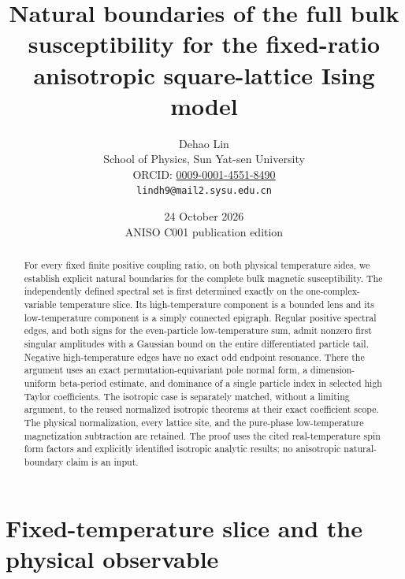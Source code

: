 \documentclass[11pt]{article}
\title{Natural boundaries of the full bulk susceptibility\newline
for the fixed-ratio anisotropic square-lattice Ising model}
\author{Dehao Lin\\{\small School of Physics, Sun Yat-sen University}\\{\small ORCID: \href{https://orcid.org/0009-0001-4551-8490}{0009-0001-4551-8490}}\\{\small\texttt{lindh9@mail2.sysu.edu.cn}}}
\date{24 October 2026\\{\small ANISO C001 publication edition}}
\numberwithin{equation}{section}
\theoremstyle{definition}
\begin{document}
\maketitle
\begin{abstract}
For every fixed finite positive coupling ratio, on both physical
temperature sides, we establish explicit natural boundaries for the
complete bulk magnetic susceptibility. The independently defined
spectral set is first determined exactly on the one-complex-variable
temperature slice. Its high-temperature component is a bounded lens and
its low-temperature component is a simply connected epigraph. Regular
positive spectral edges, and both signs for the even-particle low-temperature
sum, admit nonzero first singular amplitudes with a Gaussian bound on the
entire differentiated particle tail. Negative high-temperature edges have
no exact odd endpoint resonance. There the argument uses an exact
permutation-equivariant pole normal form, a dimension-uniform beta-period
estimate, and dominance of a single particle index in selected high Taylor
coefficients. The isotropic case is separately matched, without a limiting
argument, to the reused normalized isotropic theorems at their exact
coefficient scope. The physical normalization, every lattice site, and the
pure-phase low-temperature magnetization subtraction are retained. The
proof uses the cited real-temperature spin form factors and explicitly
identified isotropic analytic results; no anisotropic natural-boundary
claim is an input. \end{abstract}
\tableofcontents

\section{Fixed-temperature slice and the physical observable}\label{sec:physical}
\end{document}

